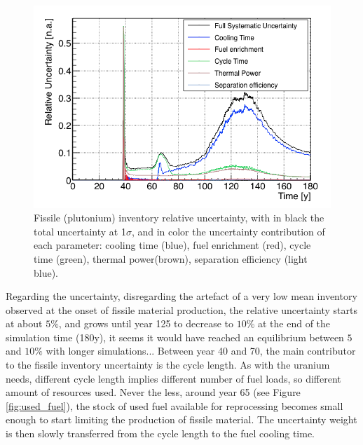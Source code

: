 \documentclass{anstrans}
\begin{document}
\begin{figure}[h!!] %
    \centering
    \includegraphics[scale=0.35]{pu_uncer}
    \caption{Fissile (plutonium) inventory relative uncertainty, with
    in black the total uncertainty at 1$\sigma$, and in color the uncertainty
    contribution of each parameter: cooling time (blue), fuel enrichment (red),
    cycle time (green), thermal power(brown), separation efficiency (light
    blue).}\label{fig:pu_uncer}
\end{figure}

Regarding the uncertainty, disregarding the artefact of a very low mean inventory
observed at the onset of fissile material production, the relative uncertainty
starts at about $5\%$, and grows until year
125 to decrease to $10\%$ at the end of the simulation time (180y), it seems
it would have reached an equilibrium between $5$ and $10\%$ with longer
simulations...
Between year 40 and 70, the main contributor to the fissile inventory
uncertainty is the cycle length.  As with the uranium needs, different cycle length
implies different number of fuel loads, so different amount of resources used.  Never the less, around year 65 (see Figure
\ref{fig:used_fuel}), the stock of used fuel available for reprocessing becomes
small enough to start limiting the production of fissile material.
The uncertainty weight is then slowly transferred from
the cycle length to the fuel cooling time.
\end{document}
